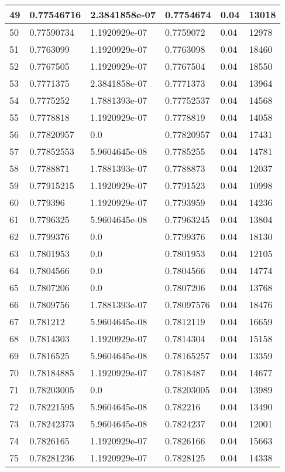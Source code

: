 \begin{longtable}{|l|l|l|l|l|l|}
49 & 0.77546716 & 2.3841858e-07 & 0.7754674 & 0.04 & 13018 \\ \hline 
50 & 0.77590734 & 1.1920929e-07 & 0.7759072 & 0.04 & 12978 \\ \hline 
51 & 0.7763099 & 1.1920929e-07 & 0.7763098 & 0.04 & 18460 \\ \hline 
52 & 0.7767505 & 1.1920929e-07 & 0.7767504 & 0.04 & 18550 \\ \hline 
53 & 0.7771375 & 2.3841858e-07 & 0.7771373 & 0.04 & 13964 \\ \hline 
54 & 0.7775252 & 1.7881393e-07 & 0.77752537 & 0.04 & 14568 \\ \hline 
55 & 0.7778818 & 1.1920929e-07 & 0.7778819 & 0.04 & 14058 \\ \hline 
56 & 0.77820957 & 0.0 & 0.77820957 & 0.04 & 17431 \\ \hline 
57 & 0.77852553 & 5.9604645e-08 & 0.7785255 & 0.04 & 14781 \\ \hline 
58 & 0.7788871 & 1.7881393e-07 & 0.7788873 & 0.04 & 12037 \\ \hline 
59 & 0.77915215 & 1.1920929e-07 & 0.7791523 & 0.04 & 10998 \\ \hline 
60 & 0.779396 & 1.1920929e-07 & 0.7793959 & 0.04 & 14236 \\ \hline 
61 & 0.7796325 & 5.9604645e-08 & 0.77963245 & 0.04 & 13804 \\ \hline 
62 & 0.7799376 & 0.0 & 0.7799376 & 0.04 & 18130 \\ \hline 
63 & 0.7801953 & 0.0 & 0.7801953 & 0.04 & 12105 \\ \hline 
64 & 0.7804566 & 0.0 & 0.7804566 & 0.04 & 14774 \\ \hline 
65 & 0.7807206 & 0.0 & 0.7807206 & 0.04 & 13768 \\ \hline 
66 & 0.7809756 & 1.7881393e-07 & 0.78097576 & 0.04 & 18476 \\ \hline 
67 & 0.781212 & 5.9604645e-08 & 0.7812119 & 0.04 & 16659 \\ \hline 
68 & 0.7814303 & 1.1920929e-07 & 0.7814304 & 0.04 & 15158 \\ \hline 
69 & 0.7816525 & 5.9604645e-08 & 0.78165257 & 0.04 & 13359 \\ \hline 
70 & 0.78184885 & 1.1920929e-07 & 0.7818487 & 0.04 & 14677 \\ \hline 
71 & 0.78203005 & 0.0 & 0.78203005 & 0.04 & 13989 \\ \hline 
72 & 0.78221595 & 5.9604645e-08 & 0.782216 & 0.04 & 13490 \\ \hline 
73 & 0.78242373 & 5.9604645e-08 & 0.7824237 & 0.04 & 12001 \\ \hline 
74 & 0.7826165 & 1.1920929e-07 & 0.7826166 & 0.04 & 15663 \\ \hline 
75 & 0.78281236 & 1.1920929e-07 & 0.7828125 & 0.04 & 14338 \\ \hline 
\end{longtable}